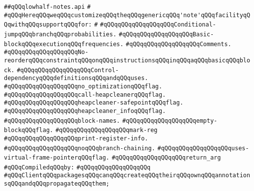 \label{src/lib/compiler/back/low/code/lowhalf-notes.api}
\verb|##qQQqlowhalf-notes.api|\newline
\verb|#|\newline
\verb|#qQQqHereqQQqweqQQqcustomizeqQQqtheqQQqgenericqQQq'note'qQQqfacilityqQQqwithqQQqsupportqQQqfor:|\newline
\verb|#|\newline
\verb|#qQQqqQQqqQQqqQQqqQQqConditional-jumpqQQqbranchqQQqprobabilities.|\newline
\verb|#qQQqqQQqqQQqqQQqqQQqBasic-blockqQQqexecutionqQQqfrequencies.|\newline
\verb|#qQQqqQQqqQQqqQQqqQQqComments.|\newline
\verb|#qQQqqQQqqQQqqQQqqQQqNo-reorderqQQqconstraintqQQqonqQQqinstructionsqQQqinqQQqaqQQqbasicqQQqblock.|\newline
\verb|#qQQqqQQqqQQqqQQqqQQqControl-dependencyqQQqdefinitionsqQQqandqQQquses.|\newline
\verb|#qQQqqQQqqQQqqQQqqQQqno_optimizationqQQqflag.|\newline
\verb|#qQQqqQQqqQQqqQQqqQQqcall-heapcleanerqQQqflag.|\newline
\verb|#qQQqqQQqqQQqqQQqqQQqheapcleaner-safepointqQQqflag.|\newline
\verb|#qQQqqQQqqQQqqQQqqQQqheapcleaner_infoqQQqflag.|\newline
\verb|#qQQqqQQqqQQqqQQqqQQqblock-names.|\newline
\verb|#qQQqqQQqqQQqqQQqqQQqempty-blockqQQqflag.|\newline
\verb|#qQQqqQQqqQQqqQQqqQQqmark-reg|\newline
\verb|#qQQqqQQqqQQqqQQqqQQqprint-register-info.|\newline
\verb|#qQQqqQQqqQQqqQQqqQQqnoqQQqbranch-chaining.|\newline
\verb|#qQQqqQQqqQQqqQQqqQQquses-virtual-frame-pointerqQQqflag.|\newline
\verb|#qQQqqQQqqQQqqQQqqQQqreturn_arg|\newline
\newline
\verb|#qQQqCompiledqQQqby:|\newline
\verb|#qQQqqQQqqQQqqQQqqQQq|\newline
\newline
\newline
\newline
\verb|#qQQqClientqQQqpackagesqQQqcanqQQqcreateqQQqtheirqQQqownqQQqannotationsqQQqandqQQqpropagateqQQqthem;|\newline
